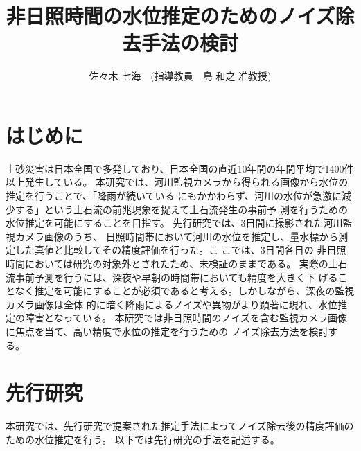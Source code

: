 \documentclass[10pt,a4j,twocolumn,oneside]{jsarticle}
\title{
  {\bf
  非日照時間の水位推定のためのノイズ除去手法の検討
}}
\author{佐々木 七海　(指導教員　島 和之 准教授)}
\date{}           %
\begin{document}
%


\maketitle
\thispagestyle{empty}


\section{はじめに}

土砂災害は日本全国で多発しており、日本全国の直近10年間の年間平均で1400件以上発生している。
本研究では、河川監視カメラから得られる画像から水位の推定を行うことで、「降雨が続いている
にもかかわらず、河川の水位が急激に減少する」という土石流の前兆現象を捉えて土石流発生の事前予
測を行うための水位推定を可能にすることを目指す。
先行研究では、3日間に撮影された河川監視カメラ画像のうち、
日照時間帯において河川の水位を推定し、量水標から測定した真値と比較してその精度評価を行った。こ
こでは、3日間各日の
非日照時間においては研究の対象外とされたため、未検証のままである。
実際の土石流事前予測を行うには、深夜や早朝の時間帯においても精度を大きく下
げることなく推定を可能にすることが必須であると考える。しかしながら、深夜の監視カメラ画像は全体
的に暗く降雨によるノイズや異物がより顕著に現れ、水位推定の障害となっている。
本研究では非日照時間のノイズを含む監視カメラ画像に焦点を当て、高い精度で水位の推定を行うための
ノイズ除去方法を検討する。
\section{先行研究}
本研究では、先行研究で提案された推定手法によってノイズ除去後の精度評価のための水位推定を行う。
以下では先行研究の手法を記述する。
\end{document}
